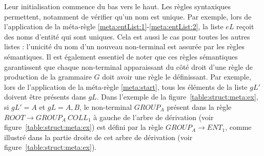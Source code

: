 Leur initialisation commence du bas vers le haut.
Les règles syntaxiques permettent, notamment de vérifier qu'un nom est unique.
Par exemple, lors de l'application de la méta-règle \ref{meta:entList:1}-\ref{meta:entList:2}, la liste $eL$ reçoit des noms d'entité qui sont uniques.
Cela est aussi le cas pour toutes les autres listes : l'unicité du nom d'un nouveau non-terminal est assurée par les règles sémantiques.
Il est également essentiel de noter que ces règles sémantiques garantissent que chaque non-terminal apparaissant du côté droit d'une règle de production de la grammaire $G$ doit avoir une règle le définissant.
Par exemple, lors de l'application de la méta-règle \ref{meta:start}, tous les éléments de la liste $gL'$ doivent être présents dans $gL$.
Dans l'exemple de la figure~\ref{table:struct:meta:ex}, si $gL' = {A}$ et $gL = {A, B}$, le non-terminal $GROUP_A$ présent dans la règle $ROOT \rightarrow GROUP_A ~ COLL_1$ à gauche de l'arbre de dérivation (voir figure~\ref{table:struct:meta:ex}) est défini par la règle $GROUP_A \rightarrow ENT_1$, comme illustré dans la partie droite de cet arbre de dérivation (voir figure~\ref{table:struct:meta:ex}).

